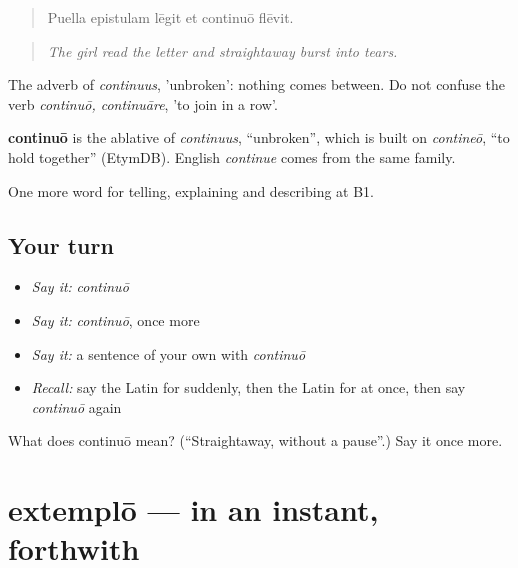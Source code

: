\begin{quote}
Puella epistulam lēgit et continuō flēvit.
\end{quote}

\begin{quote}
\emph{The girl read the letter and straightaway burst into tears.}
\end{quote}

The adverb of \emph{continuus}, 'unbroken': nothing comes between. Do not confuse the verb \emph{continuō, continuāre}, 'to join in a row'.

\begin{cousinweb}
\textbf{continuō} is the ablative of \emph{continuus}, \textquotedblleft{}unbroken\textquotedblright{}, which is built on \emph{contineō}, \textquotedblleft{}to hold together\textquotedblright{} (EtymDB). English \emph{continue} comes from the same family.
\end{cousinweb}

\begin{grammarlens}[title={What you've built}]
One more word for telling, explaining and describing at B1.
\end{grammarlens}

\subsection*{Your turn}
\begin{itemize}
\raggedright
  \item \emph{Say it:} \emph{continuō}
  \item \emph{Say it:} \emph{continuō}, once more
  \item \emph{Say it:} a sentence of your own with \emph{continuō}
  \item \emph{Recall:} say the Latin for suddenly, then the Latin for at once, then say \emph{continuō} again
\end{itemize}

\begin{tcolorbox}[breakable,colback=teal!4,colframe=teal!35!black,title={Before you move on}]
What does continuō mean? (\textquotedblleft{}Straightaway, without a pause\textquotedblright{}.) Say it once more.
\end{tcolorbox}
\section[extemplō]{extemplō — in an instant, forthwith}

\label{lesson:LA-C292-extemplo}



